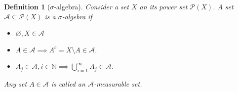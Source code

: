\documentclass[11pt, letter]{book}
\newtheorem{theorem}{Theorem}[section]
\newtheorem{definition}[theorem]{Definition}
\newtheorem{corollary}[theorem]{Corollary}
\newcommand\R{\mathbb{R}}
\begin{document}
\begin{definition}[$\sigma$-algebra]
Consider a set $X$ an its power set $\mathcal{P}(X)$. A set $\mathcal{A} \subseteq \mathcal{P}(X)$ is a $\sigma$-algebra if 
\begin{itemize}
    \item $\varnothing, X \in \mathcal{A} $
    \item $A\in \mathcal{A} \implies A^c = X\setminus A \in \mathcal{A}$.
    \item $A_j \in \mathcal{A}, i\in \mathbb{N} \implies \bigcup^\infty_{i=1} A_j \in \mathcal{A}$.
\end{itemize}
Any set $A\in \mathcal{A}$ is called an $\mathcal{A}$-measurable set. 
\end{definition}
\end{document}
